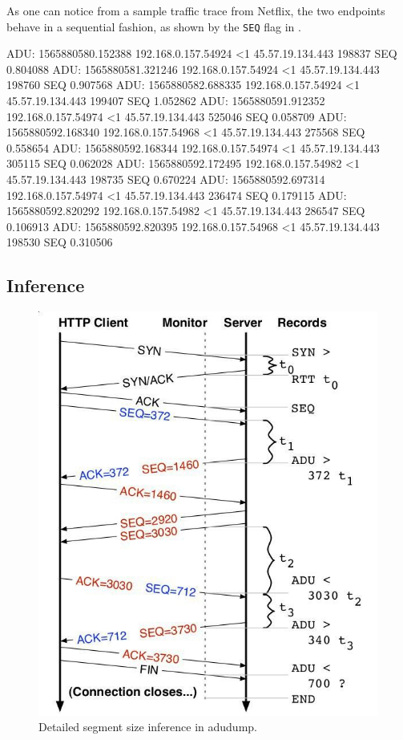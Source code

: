 As one can notice from a sample traffic trace from Netflix, the two endpoints
behave in a sequential fashion, as shown by the \texttt{SEQ} flag in
.

\begin{adu}[caption={Incoming traffic trace of Mulan, captured at 10Mbps (first 10 segments).}, label={lst:adutrace}]
ADU: 1565880580.152388 192.168.0.157.54924 <1 45.57.19.134.443 198837 SEQ 0.804088
ADU: 1565880581.321246 192.168.0.157.54924 <1 45.57.19.134.443 198760 SEQ 0.907568
ADU: 1565880582.688335 192.168.0.157.54924 <1 45.57.19.134.443 199407 SEQ 1.052862
ADU: 1565880591.912352 192.168.0.157.54974 <1 45.57.19.134.443 525046 SEQ 0.058709
ADU: 1565880592.168340 192.168.0.157.54968 <1 45.57.19.134.443 275568 SEQ 0.558654
ADU: 1565880592.168344 192.168.0.157.54974 <1 45.57.19.134.443 305115 SEQ 0.062028
ADU: 1565880592.172495 192.168.0.157.54982 <1 45.57.19.134.443 198735 SEQ 0.670224
ADU: 1565880592.697314 192.168.0.157.54974 <1 45.57.19.134.443 236474 SEQ 0.179115
ADU: 1565880592.820292 192.168.0.157.54982 <1 45.57.19.134.443 286547 SEQ 0.106913
ADU: 1565880592.820395 192.168.0.157.54968 <1 45.57.19.134.443 198530 SEQ 0.310506
\end{adu}

\subsection{Inference}

\begin{figure}[!h]
  \centering
  \includegraphics[width=0.6\columnwidth]{img/adudump.png}
  \caption{Detailed segment size inference in adudump.}
  \label{fig:adudump}
\end{figure}

